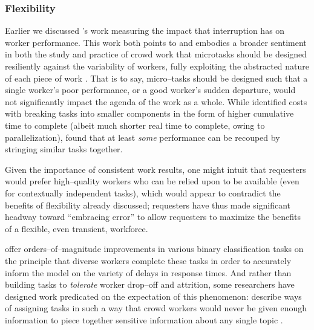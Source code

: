 \documentclass[trackingWork]{subfiles}
\begin{document}
{\subsubsection{Flexibility}\label{sec:flexibility}

Earlier we discussed \citeauthor{cheng2015break}'s work
measuring the impact that interruption has on worker performance.
This work both points to and embodies a broader sentiment in
both the study and practice
of crowd work that microtasks should be designed resiliently against the variability of workers,
fully exploiting the abstracted nature of each piece of work
\cite{interruptionIqbal,delayAndOrderLasecki,vaish2014low}.
That is to say, micro--tasks should be designed such that a single worker's poor performance,
or a good worker's sudden departure,
would not significantly impact the agenda of the work as a whole.
While \citeauthor{cheng2015break} identified costs with breaking tasks into smaller components
in the form of higher cumulative time to complete
(albeit much shorter real time to complete, owing to parallelization),
\citeauthor{delayAndOrderLasecki} found that at least \textit{some} performance can be recouped by stringing 
similar tasks together.


Given the importance of consistent work results, one might intuit that
requesters would prefer high--quality workers who can be relied upon to be available
(even for contextually independent tasks),
which would appear to contradict the benefits of flexibility already discussed;
requesters have thus made significant headway toward
``embracing error'' to allow requesters to maximize the benefits of a flexible,
even transient,
workforce.

\citeauthor{embracingErrorKrishna} offer orders--of--magnitude improvements
in various binary classification tasks
on the principle that diverse workers complete these tasks
in order to accurately inform the model on the variety of delays in response times.
And rather than building tasks to \textit{tolerate} worker drop--off and attrition,
some researchers have designed work predicated on the expectation of this phenomenon:
\citeauthor{sensitiveTasks} describe ways of assigning tasks in such a way that
crowd workers would never be given enough information to piece together sensitive information about
any single topic
\cite{sensitiveTasks}.

}
\end{document}
